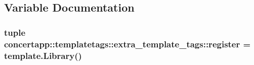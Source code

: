 \subsection{Variable Documentation}
\hypertarget{namespaceconcertapp_1_1templatetags_1_1extra__template__tags_ac6d2d1e02fc76b94dea43fdcc69d4574}{
\subsubsection[{register}]{\setlength{\rightskip}{0pt plus 5cm}tuple {\bf concertapp::templatetags::extra\_\-template\_\-tags::register} = template.Library()}}
\label{namespaceconcertapp_1_1templatetags_1_1extra__template__tags_ac6d2d1e02fc76b94dea43fdcc69d4574}

